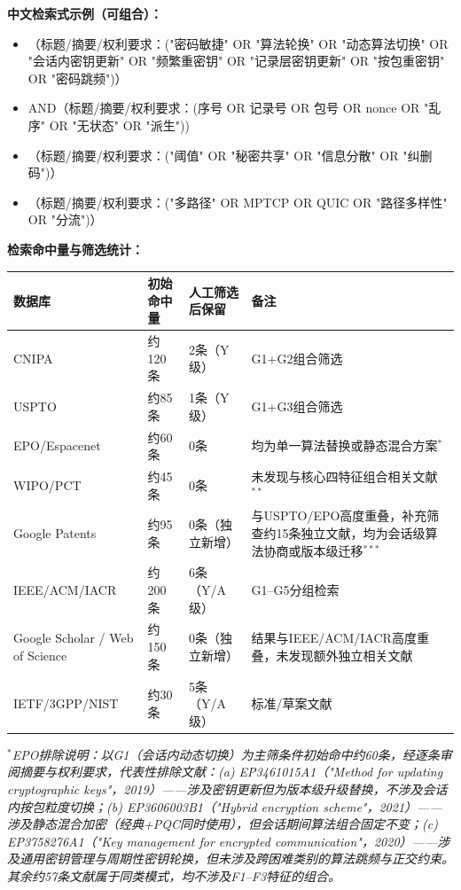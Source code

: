\documentclass[12pt,a4paper]{article}
\begin{document}
\noindent\textbf{中文检索式示例（可组合）：}
\begin{itemize}[leftmargin=2em]
    \item （标题/摘要/权利要求：("密码敏捷" OR "算法轮换" OR "动态算法切换" OR "会话内密钥更新" OR "频繁重密钥" OR "记录层密钥更新" OR "按包重密钥" OR "密码跳频")）
    \item AND（标题/摘要/权利要求：(序号 OR 记录号 OR 包号 OR nonce OR "乱序" OR "无状态" OR "派生"))
    \item （标题/摘要/权利要求：("阈值" OR "秘密共享" OR "信息分散" OR "纠删码")）
    \item （标题/摘要/权利要求：("多路径" OR MPTCP OR QUIC OR "路径多样性" OR "分流")）
\end{itemize}

\vspace{0.5em}
\noindent\textbf{检索命中量与筛选统计：}


\begin{tabular}{|p{3.5cm}|p{3.5cm}|p{3.5cm}|p{3.5cm}|}
\hline
\textbf{数据库} & \textbf{初始命中量} & \textbf{人工筛选后保留} & \textbf{备注} \\
\hline
CNIPA & 约120条 & 2条（Y级） & G1+G2组合筛选 \\
\hline
USPTO & 约85条 & 1条（Y级） & G1+G3组合筛选 \\
\hline
EPO/Espacenet & 约60条 & 0条 & 均为单一算法替换或静态混合方案$^*$ \\
\hline
WIPO/PCT & 约45条 & 0条 & 未发现与核心四特征组合相关文献$^{**}$ \\
\hline
Google Patents & 约95条 & 0条（独立新增） & 与USPTO/EPO高度重叠，补充筛查约15条独立文献，均为会话级算法协商或版本级迁移$^{***}$ \\
\hline
IEEE/ACM/IACR & 约200条 & 6条（Y/A级） & G1--G5分组检索 \\
\hline
Google Scholar / Web of Science & 约150条 & 0条（独立新增） & 结果与IEEE/ACM/IACR高度重叠，未发现额外独立相关文献 \\
\hline
IETF/3GPP/NIST & 约30条 & 5条（Y/A级） & 标准/草案文献 \\
\hline
\end{tabular}

\vspace{0.3em}
\noindent\textit{$^*$EPO排除说明：以G1（会话内动态切换）为主筛条件初始命中约60条，经逐条审阅摘要与权利要求，代表性排除文献：(a) EP3461015A1（"Method for updating cryptographic keys"，2019）——涉及密钥更新但为版本级升级替换，不涉及会话内按包粒度切换；(b) EP3606003B1（"Hybrid encryption scheme"，2021）——涉及静态混合加密（经典+PQC同时使用），但会话期间算法组合固定不变；(c) EP3758276A1（"Key management for encrypted communication"，2020）——涉及通用密钥管理与周期性密钥轮换，但未涉及跨困难类别的算法跳频与正交约束。其余约57条文献属于同类模式，均不涉及F1--F3特征的组合。}
\end{document}

